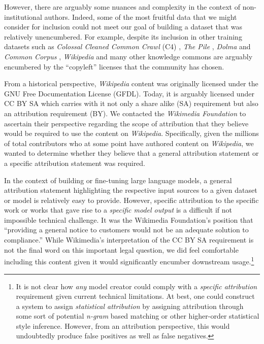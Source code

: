 However, there are arguably some nuances and complexity in the context of non-institutional authors. Indeed, some of the most fruitful data that we might consider for inclusion could not meet our goal of building a dataset that was relatively unencumbered.  For example, despite its inclusion in other training datasets such as \textit{Colossal Cleaned Common Crawl} (C4) \cite{raffel2020exploring}, \textit{The Pile} \cite{gao2020pile}, \textit{Dolma} \cite{soldaini-etal-2024-dolma} and \textit{Common Corpus} \cite{arnett2024toxicity}, \textit{Wikipedia} and many other knowledge commons are arguably encumbered by the ``copyleft'' licenses that the community has chosen. 

From a historical perspective, \textit{Wikipedia} content was originally licensed under the GNU Free Documentation License  (GFDL).\cite{roessing2010authorship}  Today, it is arguably licensed under CC BY SA which carries with it not only a share alike (SA) requirement but also an attribution requirement (BY).  We contacted the \textit{Wikimedia Foundation} to ascertain their perspective regarding the scope of attribution that they believe would be required to use the content on \textit{Wikipedia}.  Specifically, given the millions of total contributors who at some point have authored content on \textit{Wikipedia}, we wanted to determine whether they believe that a general attribution statement or a specific attribution statement was required.   

In the context of building or fine-tuning large language models, a general attribution statement highlighting the respective input sources to a given dataset or model is relatively easy to provide.  However, specific attribution to the specific work or works that gave rise to a \textit{specific model output} is a difficult if not impossible technical challenge. It was the Wikimedia Foundation's position that ``providing a general notice to customers would not be an adequate solution to compliance.''  While Wikimedia's interpretation of the CC BY SA requirement is not the final word on this important legal question, we did feel comfortable including this content given it would significantly encumber downstream usage.\footnote{It is not clear how \textit{any} model creator could comply with a \textit{specific attribution} requirement given current technical limitations. At best, one could construct a system to assign \textit{statistical attribution} by assigning attribution through some sort of 
potential \textit{n-gram} based matching or other higher-order statistical style inference.  However, from an attribution perspective, this would undoubtedly produce false positives as well as false negatives.}  

